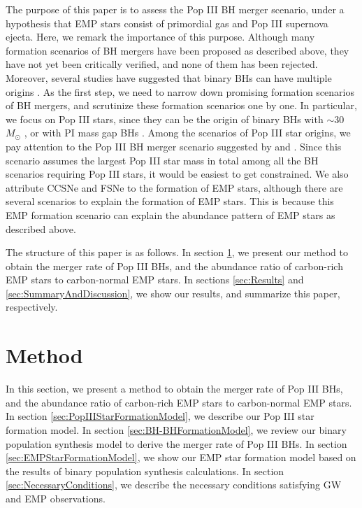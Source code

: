 \documentclass[pdftex]{pasj01}
\begin{document}
The purpose of this paper is to assess the Pop III BH merger scenario,
under a hypothesis that EMP stars consist of primordial gas and Pop
III supernova ejecta. Here, we remark the importance of this
purpose. Although many formation scenarios of BH mergers have been
proposed as described above, they have not yet been critically
verified, and none of them has been rejected. Moreover, several
studies have suggested that binary BHs can have multiple origins
\citep{2021MNRAS.507.5224B, 2021ApJ...910..152Z, 2021ApJ...913L...5N,
  2021JCAP...03..068H}. As the first step, we need to narrow down
promising formation scenarios of BH mergers, and scrutinize these
formation scenarios one by one.  In particular, we focus on Pop III
stars, since they can be the origin of binary BHs with $\sim 30$
$M_\odot$ \citep{2014MNRAS.442.2963K, 2021MNRAS.504L..28K}, or with PI
mass gap BHs \citep{2021MNRAS.505.2170T}.  Among the scenarios of Pop
III star origins, we pay attention to the Pop III BH merger scenario
suggested by \cite{2014MNRAS.442.2963K} and
\cite{2021MNRAS.504L..28K}.  Since this scenario assumes the largest
Pop III star mass in total among all the BH scenarios requiring Pop
III stars, it would be easiest to get constrained. We also attribute
CCSNe and FSNe to the formation of EMP stars, although there are
several scenarios to explain the formation of EMP stars.  This is
because this EMP formation scenario can explain the abundance pattern
of EMP stars \citep{2013ApJ...773...33I} as described above.

The structure of this paper is as follows. In section
\ref{sec:Method}, we present our method to obtain the merger rate of
Pop III BHs, and the abundance ratio of carbon-rich EMP stars to
carbon-normal EMP stars. In sections \ref{sec:Results} and
\ref{sec:SummaryAndDiscussion}, we show our results, and summarize
this paper, respectively.

\section{Method}
\label{sec:Method}

In this section, we present a method to obtain the merger rate of Pop
III BHs, and the abundance ratio of carbon-rich EMP stars to
carbon-normal EMP stars. In section
\ref{sec:PopIIIStarFormationModel}, we describe our Pop III star
formation model. In section \ref{sec:BH-BHFormationModel}, we review
our binary population synthesis model to derive the merger rate of Pop
III BHs. In section \ref{sec:EMPStarFormationModel}, we show our EMP
star formation model based on the results of binary population
synthesis calculations. In section \ref{sec:NecessaryConditions}, we
describe the necessary conditions satisfying GW and EMP observations.
\end{document}
